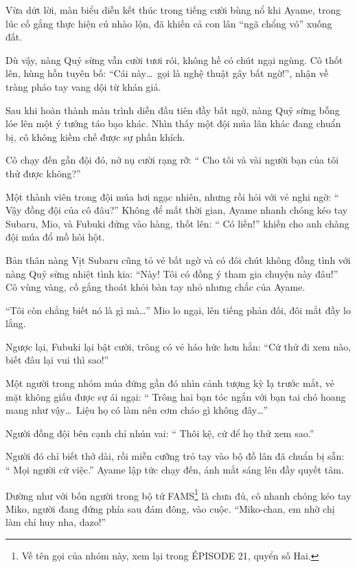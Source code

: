 \documentclass[../main.tex]{subfiles}
\begin{document}
Vừa dứt lời, màn biểu diễn kết thúc trong tiếng cười bùng nổ khi Ayame, trong lúc cố gắng thực hiện cú nhào lộn, đã khiến cả con lân ``ngã chổng vó'' xuống đất.

Dù vậy, nàng Quỷ sừng vẫn cười tươi rói, không hề có chút ngại ngùng. Cô thốt lên, hùng hồn tuyên bố: ``Cái này\dots\ gọi là nghệ thuật gây bất ngờ!'', nhận về tràng pháo tay vang dội từ khán giả.

Sau khi hoàn thành màn trình diễn đầu tiên đầy bất ngờ, nàng Quỷ sừng bỗng lóe lên một ý tưởng táo bạo khác. Nhìn thấy một đội múa lân khác đang chuẩn bị, cô không kiềm chế được sự phấn khích.

Cô chạy đến gần đội đó, nở nụ cười rạng rỡ: ``{\color{red} Cho tôi và vài người bạn của tôi thử được không?}''

Một thành viên trong đội múa hơi ngạc nhiên, nhưng rồi hỏi với vẻ nghi ngờ: ``{\color{red} Vậy đồng đội của cô đâu?}'' Không để mất thời gian, Ayame nhanh chóng kéo tay Subaru, Mio, và Fubuki đứng vào hàng, thốt lên: ``{\color{red} Có liền!}'' khiến cho anh chàng đội múa đổ mồ hôi hột.

Bản thân nàng Vịt Subaru cũng tỏ vẻ bất ngờ và có đôi chút không đồng tình với nàng Quỷ sừng nhiệt tình kia: ``Này! Tôi có đồng ý tham gia chuyện này đâu!'' Cô vùng vàng, cố gắng thoát khỏi bàn tay nhỏ nhưng chắc của Ayame.

``Tôi còn chẳng biết nó là gì mà\dots'' Mio lo ngại, lên tiếng phản đối, đôi mắt đầy lo lắng.

Ngược lại, Fubuki lại bật cười, trông có vẻ háo hức hơn hẳn: ``Cứ thử đi xem nào, biết đâu lại vui thì sao!''

Một người trong nhóm múa đứng gần đó nhìn cảnh tượng kỳ lạ trước mắt, vẻ mặt không giấu được sự ái ngại: ``{\color{red} Trông hai bạn tóc ngắn với bạn tai chó hoang mang như vậy\dots\ Liệu họ có làm nên cơm cháo gì không đây\dots}''

Người đồng đội bên cạnh chỉ nhún vai: ``{\color{red} Thôi kệ, cứ để họ thử xem sao.}''

Người đó chỉ biết thở dài, rồi miễn cưỡng trỏ tay vào bộ đồ lân đã chuẩn bị sẵn: ``{\color{red} Mọi người cứ việc.}'' Ayame lập tức chạy đến, ánh mắt sáng lên đầy quyết tâm.

Dường như với bốn người trong bộ tứ FAMS\footnote{Về tên gọi của nhóm này, xem lại trong {\flaregothic ÉPISODE 21}, quyển số Hai.} là chưa đủ, cô nhanh chóng kéo tay Miko, người đang đứng phía sau đám đông, vào cuộc. ``Miko-chan, em nhờ chị làm chỉ huy nha, dazo!''
\end{document}
